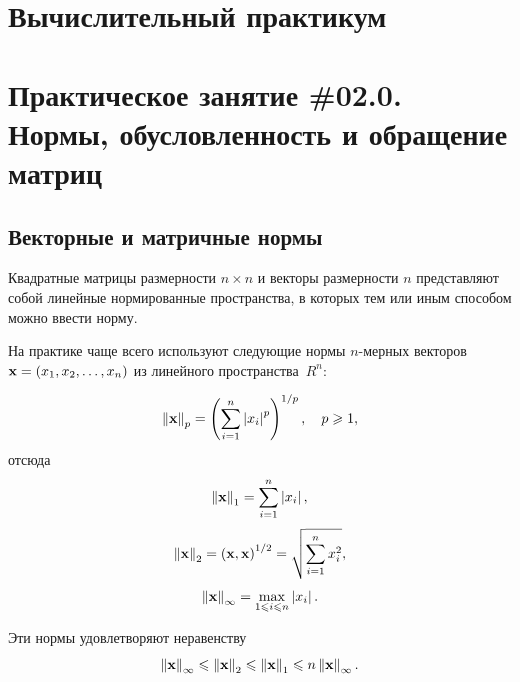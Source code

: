 \documentclass[12pt]{article}
\newcommand{\norm}[1]{\left\| #1 \right\|}
\begin{document}
	\begin{flushright}
	\end{flushright}
	\begin{flushright}
	\end{flushright}
	\section*{Вычислительный практикум}
	\section*{Практическое занятие \#02.0. Нормы, обусловленность и обращение матриц}
	
	\subsection*{Векторные и матричные нормы}
	Квадратные матрицы размерности $n\times n$ и векторы размерности $n$ представляют собой линейные нормированные пространства, в которых тем или иным способом можно ввести норму.
	
	На практике чаще всего используют следующие нормы $n$-мерных векторов $\bold{x}=\left(x_1,x_2,\ldots,x_n\right)$ из линейного пространства~$R^n$:
	
	\begin{equation}
		\norm{\bold{x}}_p=\left(\sum_{i=1}^{n}\left|x_i\right|^p\right)^{1/p},\quad p\geqslant 1,
	\end{equation}
	отсюда
	\begin{equation}
		\norm{\bold{x}}_1=\sum_{i=1}^{n}\left|x_i\right|,
	\end{equation}
	\begin{equation}
		\norm{\bold{x}}_2=\left(\bold{x},\bold{x}\right)^{1/2}=\sqrt{\sum_{i=1}^n x^2_i},
	\end{equation}
	\begin{equation}
		\norm{\bold{x}}_{\infty}=\max_{1\leqslant i \leqslant n}\left|x_i\right|.
	\end{equation}
	
	Эти нормы удовлетворяют неравенству
	\begin{equation}
		\norm{\bold{x}}_{\infty}\leqslant\norm{\bold{x}}_2\leqslant\norm{\bold{x}}_1\leqslant n\norm{\bold{x}}_{\infty}.
	\end{equation}
	
\end{document}
